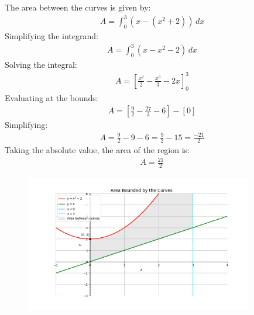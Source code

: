 \documentclass[journal]{IEEEtran}
\begin{document}
The area between the curves is given by:
\begin{align}
    A = \int_{0}^{3} (x - (x^2 + 2)) \, dx
\end{align}
Simplifying the integrand:
\begin{align}
    A = \int_{0}^{3} (x - x^2 - 2) \, dx
\end{align}
Solving the integral:
\begin{align}
    A = \left[\frac{x^2}{2} - \frac{x^3}{3} - 2x\right]_{0}^{3}
\end{align}
Evaluating at the bounds:
\begin{align}
    A = \left[\frac{9}{2} - \frac{27}{3} - 6 \right] - \left[0\right]
\end{align}
Simplifying:
\begin{align}
    A = \frac{9}{2} - 9 - 6 = \frac{9}{2} - 15 = \frac{-21}{2}
\end{align}
Taking the absolute value, the area of the region is:
\begin{align}
    A = \frac{21}{2}
\end{align}
\begin{figure}[htp]
    \centering
    \includegraphics[width=10cm]{figs/Figure_1.png}
\end{figure}
\end{document}
